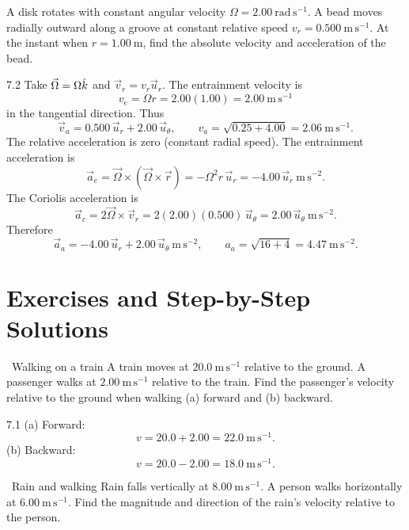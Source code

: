 \begin{worked}
A disk rotates with constant angular velocity
$\Omega=2.00\ \mathrm{rad\,s^{-1}}$. A bead moves radially outward along a
groove at constant relative speed $v_r=0.500\ \mathrm{m\,s^{-1}}$. At the instant
when $r=1.00\ \mathrm{m}$, find the absolute velocity and acceleration of the
bead.
\end{worked}

\begin{solution}{7.2}
Take $\vec\Omega=\Omega\hat{k}$ and $\vec v_r=v_r\vec u_r$. The entrainment
velocity is
\[
v_e=\Omega r=2.00(1.00)=2.00\ \mathrm{m\,s^{-1}}
\]
in the tangential direction. Thus
\[
\vec v_a=0.500\,\vec u_r+2.00\,\vec u_\theta,
\qquad
v_a=\sqrt{0.25+4.00}=2.06\ \mathrm{m\,s^{-1}}.
\]
The relative acceleration is zero (constant radial speed). The entrainment
acceleration is
\[
\vec a_e=\vec\Omega\times(\vec\Omega\times\vec r)
=-\Omega^2r\,\vec u_r=-4.00\,\vec u_r\ \mathrm{m\,s^{-2}}.
\]
The Coriolis acceleration is
\[
\vec a_c=2\vec\Omega\times\vec v_r
=2(2.00)(0.500)\,\vec u_\theta=2.00\,\vec u_\theta\ \mathrm{m\,s^{-2}}.
\]
Therefore
\[
\vec a_a=-4.00\,\vec u_r+2.00\,\vec u_\theta\ \mathrm{m\,s^{-2}},
\qquad
a_a=\sqrt{16+4}=4.47\ \mathrm{m\,s^{-2}}.
\]
\end{solution}

\section{Exercises and Step-by-Step Solutions}

\begin{exercise}{\warm\ Walking on a train}
A train moves at $20.0\ \mathrm{m\,s^{-1}}$ relative to the ground. A passenger
walks at $2.00\ \mathrm{m\,s^{-1}}$ relative to the train. Find the passenger's
velocity relative to the ground when walking (a) forward and (b) backward.
\end{exercise}

\begin{tabletworkspace}[6.5cm]
\end{tabletworkspace}

\begin{solution}{7.1}
(a) Forward:
\[
v=20.0+2.00=22.0\ \mathrm{m\,s^{-1}}.
\]
(b) Backward:
\[
v=20.0-2.00=18.0\ \mathrm{m\,s^{-1}}.
\]
\end{solution}

\begin{exercise}{\warm\ Rain and walking}
Rain falls vertically at $8.00\ \mathrm{m\,s^{-1}}$. A person walks horizontally
at $6.00\ \mathrm{m\,s^{-1}}$. Find the magnitude and direction of the rain's
velocity relative to the person.
\end{exercise}

